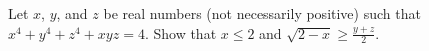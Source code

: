 Let $x$, $y$, and $z$ be real numbers (not necessarily positive) such that $x^4+y^4+z^4+xyz=4$. 
Show that $x\le2$ and $\sqrt{2-x}\ge\frac{y+z}{2}$.